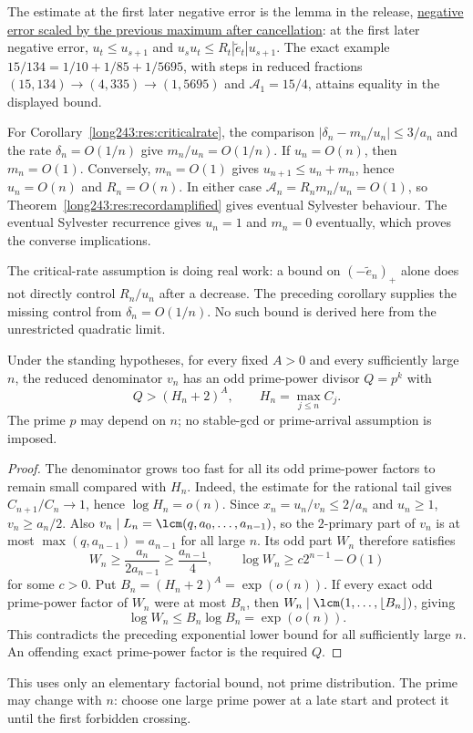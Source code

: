 The estimate at the first later negative error is the lemma in the release,
\href{https://github.com/wcook04/plectis-erdos-lean/blob/52f29ad173b04e3bac941b3663f2b9aebe5de0bb/ErdosProblems/Erdos243/SaturatedSquareTransport.lean\#L378}{negative error scaled by the previous maximum after cancellation}: at the first later negative error,
$u_t\le u_{s+1}$ and $u_su_t\le R_t|\tilde e_t|u_{s+1}$. The exact example
$15/134=1/10+1/85+1/5695$, with steps in reduced fractions
$(15,134)\to(4,335)\to(1,5695)$ and $\mathcal A_1=15/4$,
attains equality in the displayed bound.

For Corollary~\ref{long243:res:criticalrate}, the comparison
$|\delta_n-m_n/u_n|\le3/a_n$ and the rate $\delta_n=O(1/n)$ give
$m_n/u_n=O(1/n)$. If $u_n=O(n)$, then $m_n=O(1)$. Conversely,
$m_n=O(1)$ gives $u_{n+1}\le u_n+m_n$, hence $u_n=O(n)$ and
$R_n=O(n)$. In either case
$\mathcal A_n=R_nm_n/u_n=O(1)$, so
Theorem~\ref{long243:res:recordamplified} gives eventual Sylvester
behaviour. The eventual Sylvester recurrence gives $u_n=1$ and $m_n=0$ eventually,
which proves the converse implications.

The critical-rate assumption is doing real work: a bound on
$(-\tilde e_n)_+$ alone does not directly control $R_n/u_n$ after a
decrease. The preceding corollary supplies the missing control from
$\delta_n=O(1/n)$. No such bound is derived here from the unrestricted
quadratic limit.

\begin{lemma}\label{long243:res:oddpowersupply}
Under the standing hypotheses, for every fixed $A>0$ and every sufficiently large $n$, the
reduced denominator $v_n$ has an odd prime-power divisor $Q=p^k$ with
\[
 Q>(H_n+2)^A,\qquad H_n=\max_{j\le n}C_j.
\]
The prime $p$ may depend on $n$; no stable-gcd or prime-arrival assumption
is imposed.
\end{lemma}
\begin{proof}
The denominator grows too fast for all its odd prime-power factors to
remain small compared with $H_n$. Indeed, the estimate for the rational
tail gives $C_{n+1}/C_n\to1$, hence $\log H_n=o(n)$. Since $x_n=u_n/v_n\le2/a_n$ and $u_n\ge1$,
$v_n\ge a_n/2$. Also $v_n\mid L_n=\lcm(q,a_0,\ldots,a_{n-1})$,
so the $2$-primary part of $v_n$ is at most $\max(q,a_{n-1})=a_{n-1}$
for all large $n$. Its odd part $W_n$ therefore satisfies
\[
 W_n\ge\frac{a_n}{2a_{n-1}}\ge\frac{a_{n-1}}4,
 \qquad \log W_n\ge c2^{n-1}-O(1)
\]
for some $c>0$.
Put $B_n=(H_n+2)^A=\exp(o(n))$. If every exact odd prime-power factor of
$W_n$ were at most $B_n$, then
$W_n\mid\lcm(1,\ldots,\lfloor B_n\rfloor)$, giving
\[
 \log W_n\le B_n\log B_n=\exp(o(n)).
\]
This contradicts the preceding exponential lower bound for all sufficiently
large $n$. An offending exact prime-power factor is the required $Q$.
\end{proof}
This uses only an elementary factorial bound, not prime distribution.
The prime may change with $n$: choose one large prime power at a late
start and protect it until the first forbidden crossing.

